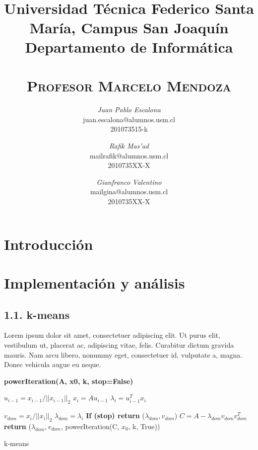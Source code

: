\documentclass{article}
\title{
  \Large\textmd{\textbf{\tareaRamo\\ \tareaTitulo}}\\
  \vspace{0.1in}
  \normalsize
  Universidad Técnica Federico Santa María, Campus San Joaquín\\
  Departamento de Informática\\
  \vspace{0.1in}
  \small{\textsc{\tareaFecha}}\\
  \vspace{0.1in}
  \large{\textsc{Profesor Marcelo Mendoza}}
}
\author{
    \textit{Juan Pablo Escalona} \\
    \small{juan.escalona@alumnos.usm.cl} \\
    \small{201073515-k}
    \and
    \textit{Rafik Mas'ad} \\
    \small{mailrafik@alumnos.usm.cl} \\
    \small{2010735XX-X}
    \and
    \textit{Gianfranco Valentino}\\
    \small{mailgina@alumnos.usm.cl}\\
    \small{2010735XX-X}
}
\date{}
\begin{document}
\maketitle


\section*{Introducción}

\lipsum[3]

\section*{Implementación y análisis}

\subsection*{1.1. \; k-means}
Lorem ipsum dolor sit amet, consectetuer adipiscing elit. Ut purus elit, vestibulum ut, placerat ac, adipiscing vitae, felis. Curabitur dictum gravida mauris. Nam arcu libero, nonummy eget, consectetuer id, vulputate a, magna. Donec vehicula augue eu neque.

\begin{algorithm}[H]
  \begin{algorithmic}[1]
    \State \textbf{powerIteration(A, x0, k, stop=False)}

        \State $u_{i-1} = {x_{i-1}}/{||x_{i-1}||_2}$
        \State $x_i = A u_{i-1}$
        \State $\lambda_{i} = u_{i-1}^{T}x_i$
    \EndFor

    \State $v_{dom} = {x_i}/{||x_i||_2}$
    \State $\lambda_{dom} = \lambda_i$
    \State \textbf{If (stop) return} ($\lambda_{dom}, v_{dom}$)
    \State $C = A - \lambda_{dom}v_{dom}v_{dom}^{T}$
    \State \textbf{return} ($\lambda_{dom}, v_{dom}$, powerIteration(C, $x_0$, k, True))
  \end{algorithmic}
  \caption{k-means}
  \label{kMeans}
\end{algorithm}
\end{document}
